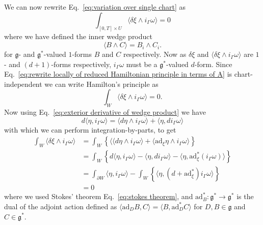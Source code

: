 We can now rewrite Eq.~\ref{eq:variation over single chart} as
\begin{equation} \label{eq:rewrite locally of reduced Hamiltonian principle in terms of A}
\int_{[0, T] \times U} \langle \delta \xi \wedge i_\Gamma \omega \rangle = 0
\end{equation}
where we have defined the inner wedge product
\begin{equation}
\langle B \wedge C \rangle = B_i \wedge C_i.
\end{equation}
for $\mathfrak{g}$- and $\mathfrak{g}^*$-valued $1$-forms $B$ and $C$ respectively. Now as $\delta \xi$ and $\langle \delta \xi \wedge i_\Gamma \omega \rangle$ are $1$- and $(d+1)$-forms respectively, $i_\Gamma \omega$ must be a $\mathfrak{g}^*$-valued $d$-form. Since Eq.~\ref{eq:rewrite locally of reduced Hamiltonian principle in terms of A} is chart-independent we can write Hamilton's principle as
\begin{equation} \label{eq:rewrite of reduced Hamiltonian principle in terms of A}
\int_W \langle \delta \xi \wedge i_\Gamma \omega \rangle = 0.
\end{equation}
Now using Eq.~\ref{eq:exterior derivative of wedge product} we have
\begin{equation}
d \langle \eta, i_\Gamma \omega \rangle = \langle d\eta \wedge i_\Gamma \omega \rangle + \langle \eta, d i_\Gamma \omega \rangle
\end{equation}
with which we can perform integration-by-parts, to get
\begin{equation} \label{eq:derivation of A eoms}
\begin{aligned}
\int_W \langle \delta \xi \wedge i_\Gamma \omega \rangle & = \int_W 
\left\{ \langle \langle d \eta \wedge i_\Gamma \omega \rangle + \langle \text{ad}_\xi \eta \wedge i_\Gamma \omega \rangle  \right\} \\
 & = \int_W \left\{ d \langle \eta, i_\Gamma \omega \rangle - \langle \eta, d i_\Gamma \omega \rangle -  \langle  \eta, \text{ad}^*_\xi (i_\Gamma \omega) \rangle \right\} \\
 & = \int_{\partial W} \langle \eta ,  i_\Gamma \omega \rangle -
 \int_W \left\{ \langle \eta,  (d + \text{ad}^*_\xi ) i_\Gamma \omega  \rangle \right\} \\
 & = 0
\end{aligned}
\end{equation}
where we used Stokes' theorem Eq.~\ref{eq:stokes theorem}, and $\text{ad}^*_{B} : \mathfrak{g}^* \to \mathfrak{g}^*$ is the dual of the adjoint action defined as $\langle \text{ad}_D B, C \rangle = \langle B, \text{ad}_D^* C \rangle$ for $D,B\in \mathfrak{g}$ and $C \in \mathfrak{g}^*$.

